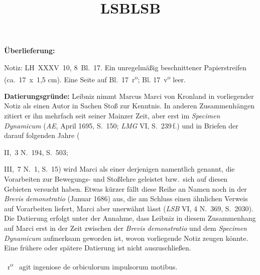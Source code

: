 %  
%
%
%
%   
%
%
\frenchspacing
%
\begin{ledgroupsized}[r]{120mm}
\footnotesize
\pstart
\noindent\textbf{Überlieferung:}
\pend
\end{ledgroupsized}
%
\begin{ledgroupsized}[r]{114mm}
\footnotesize
\pstart \parindent -6mm
%
Notiz:
LH~XXXV~10, 8~Bl.~17. 
Ein unregelmäßig beschnittener Papierstreifen (ca.~17~x~1,5 cm).
Eine Seite auf Bl.~17~r\textsuperscript{o}; Bl. 17~v\textsuperscript{o} leer.
\pend
\end{ledgroupsized}
%
%
\vspace{5mm}
\begin{ledgroup}
\footnotesize
\pstart
\noindent%
\textbf{Datierungsgründe:}
Leibniz nimmt 
%
\protect{}Marcus Marci von Kronland 
%
in vorliegender Notiz als einen Autor in Sachen Stoß zur Kenntnis. 
%
In anderen Zusammenhängen zitiert er ihn mehrfach seit seiner Mainzer Zeit, aber erst im 
%
\textit{Specimen Dynamicum}\cite{02032} (\cite{01023}\textit{AE}, April 1695, S.~150; \textit{LMG} VI, S.~239\,f.) 
%
und in Briefen der darauf folgenden Jahre (\title{LSB} II,~3 N.~194, S.~503\cite{01514}; \title{LSB} III,~7 N.~1, S.~15\cite{01515}) 
%
wird Marci als einer derjenigen namentlich genannt, die Vorarbeiten zur Bewegungs- und Stoßlehre geleistet
%
bzw.\ sich auf diesen Gebieten versucht haben. 
%
Etwas kürzer fällt diese Reihe an Namen noch in der \textit{Brevis demonstratio} (Januar 1686) aus, 
%
die am Schluss einen ähnlichen Verweis auf Vorarbeiten liefert, Marci aber unerwähnt lässt (\cite{01099}\textit{LSB} VI, 4 N.~369, S.~2030). 
%
Die Datierung erfolgt unter der Annahme, dass Leibniz in diesem Zusammenhang auf Marci 
%
erst in der Zeit zwischen der \cite{01099}\textit{Brevis demonstratio} und dem \textit{Specimen Dynamicum}\cite{02032} 
%
aufmerksam geworden ist, wovon vorliegende Notiz zeugen könnte. 
%
Eine frühere oder spätere Datierung ist nicht auszuschließen.  
\pend 
\end{ledgroup}
%
%
\frenchspacing
\vspace{8mm}
\pstart%
\normalsize%
\noindent%
~r\textsuperscript{o}\rbrack\
%
{\lemma{Marcus Marci in lib.\ de motu}%
} 
%
agit ingeniose de 
orbiculorum\protect{} impulsorum 
motibus.\protect{}
\pend
\count{}%
\count{}%
\count{} 